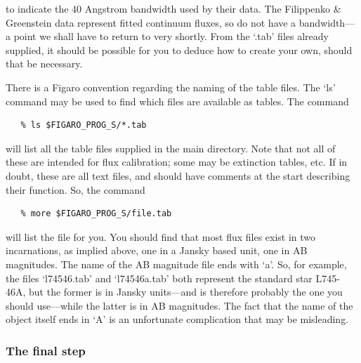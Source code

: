 \documentclass[11pt,twoside]{article}
\newcommand{\latorhtm}[2]{#1}
\newcommand{\latorhtm}[2]{#2}
\begin{document}
   to indicate the 40 Angstrom bandwidth used by their data.  The
   Filippenko \& Greenstein data represent fitted continuum fluxes,
   so do not have a bandwidth\latorhtm{---}{-}a point we shall have to
   return to very
   shortly.  From the `.tab' files already supplied, it should be
   possible for you to deduce how to create your own, should that be
   necessary.

   There is a Figaro convention regarding the naming of the table files.
   The `ls' command may be used to find which files are available
   as tables.  The command

\begin{verbatim}
   % ls $FIGARO_PROG_S/*.tab
\end{verbatim}

   will list all the table files supplied in the main directory.  Note
   that not all of these are intended for flux calibration; some may be
   extinction tables, etc.  If in doubt, these are all text files, and
   should have comments at the start describing their function.  So, the
   command

\begin{verbatim}
   % more $FIGARO_PROG_S/file.tab
\end{verbatim}

   will list the file for you.  You should find that most flux files
   exist in two incarnations, as implied above, one in a Jansky based
   unit, one in AB magnitudes.  The name of the AB magnitude file ends
   with `a'.  So, for example, the files `l74546.tab' and `l74546a.tab'
   both represent the standard star L745-46A, but the former is in
   Jansky units\latorhtm{---}{-}and is therefore probably the one you
   should use\latorhtm{---}{-}while the latter is in AB magnitudes.
   The fact that the name of the
   object itself ends in `A' is an unfortunate complication that may be
   misleading.


\subsubsection{\label{techno5final}The final step}
\end{document}
